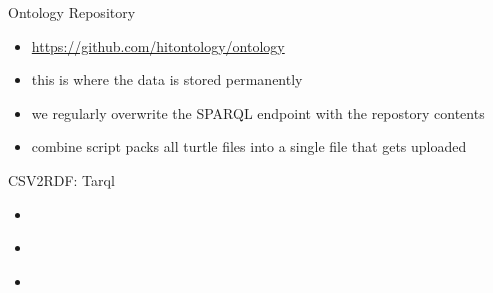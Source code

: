 \documentclass[aspectratio=1610]{beamer}
\begin{document}
\begin{frame}{Ontology Repository}
\centering
\begin{itemize}
\item \url{https://github.com/hitontology/ontology}
\item this is where the data is stored permanently
\item we regularly overwrite the SPARQL endpoint with the repostory contents
\item combine script packs all turtle files into a single file that gets uploaded
\end{itemize}
\end{frame}

\begin{frame}{CSV2RDF: Tarql}
\centering
\begin{itemize}
\item
\end{itemize}
\end{frame}

\begin{frame}{}
\centering
\begin{itemize}
\item
\end{itemize}
\end{frame}

\begin{frame}{}
\centering
\begin{itemize}
\item
\end{itemize}
\end{frame}
\end{document}

